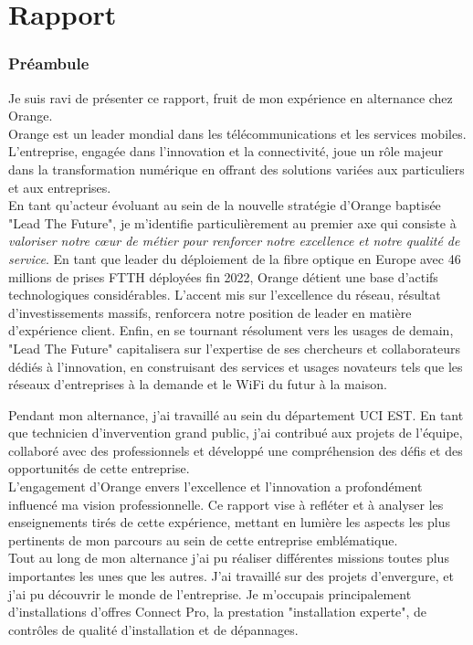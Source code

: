 \documentclass[12pt, a4paper]{article}
\begin{document}
\part{\Large{Rapport}}
\newpage
\pagestyle{fancy}
\section{Préambule}
Je suis ravi de présenter ce rapport, fruit de mon expérience en alternance chez Orange.\\

Orange est un leader mondial dans les télécommunications et les services mobiles.
L'entreprise, engagée dans l'innovation et la connectivité, joue un rôle majeur dans la
transformation numérique en offrant des solutions variées aux particuliers et aux entreprises.\\

En tant qu'acteur évoluant au sein de la nouvelle
stratégie d'Orange baptisée "Lead The Future",
je m'identifie particulièrement au premier axe
qui consiste à \textit{valoriser notre cœur de métier pour
renforcer notre excellence et notre qualité de
service}. En tant que leader du déploiement de la
fibre optique en Europe avec 46 millions de prises
FTTH déployées fin 2022,
Orange détient une base d'actifs technologiques
considérables. L'accent mis sur l'excellence du
réseau, résultat d'investissements massifs,
renforcera notre position de leader en matière
d'expérience client. Enfin,
en se tournant résolument vers les usages
de demain, "Lead The Future" capitalisera sur
l'expertise de ses chercheurs et collaborateurs
dédiés à l'innovation, en construisant des services
et usages novateurs tels que les réseaux
d'entreprises à la demande et le WiFi du futur à
la maison.

Pendant mon alternance, j'ai travaillé au sein du département \gls{UCI} EST.
En tant que technicien d'invervention grand public, j'ai contribué aux projets de l'équipe, collaboré avec des
professionnels et développé une compréhension des défis et des opportunités
de cette entreprise.\\


L'engagement d'Orange envers l'excellence et l'innovation a profondément influencé ma vision
professionnelle. Ce rapport vise à refléter et à analyser les enseignements tirés de cette
expérience, mettant en lumière les aspects les plus pertinents de mon parcours au sein de
cette entreprise emblématique.\\

Tout au long de mon alternance j'ai pu réaliser différentes missions
toutes plus importantes les unes que les autres. J'ai travaillé sur des projets
d'envergure, et j'ai pu découvrir le monde de l'entreprise.
Je m'occupais principalement d'installations d'offres
Connect Pro, la prestation "installation experte", 
de contrôles de qualité d'installation et de dépannages.\\
\end{document}
